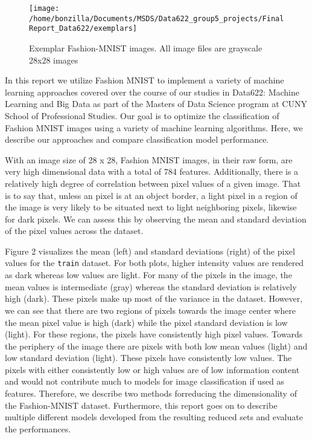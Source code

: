 \documentclass{article}
\begin{document}
\begin{figure}

{\centering \texttt{[image: /home/bonzilla/Documents/MSDS/Data622\_group5\_projects/FinalReport\_Data622/exemplars]} 

}

\caption{Exemplar Fashion-MNIST images. All image files are grayscale 28x28 images}\label{fig:unnamed-chunk-1}
\end{figure}

In this report we utilize Fashion MNIST to implement a variety of
machine learning approaches covered over the course of our studies in
Data622: Machine Learning and Big Data as part of the Masters of Data
Science program at CUNY School of Professional Studies. Our goal is to
optimize the classification of Fashion MNIST images using a variety of
machine learning algorithms. Here, we describe our approaches and
compare classification model performance.

With an image size of 28 x 28, Fashion MNIST images, in their raw form,
are very high dimensional data with a total of 784 features.
Additionally, there is a relatively high degree of correlation between
pixel values of a given image. That is to say that, unless an pixel is
at an object border, a light pixel in a region of the image is very
likely to be situated next to light neighboring pixels, likewise for
dark pixels. We can assess this by observing the mean and standard
deviation of the pixel values across the dataset.

Figure 2 visualizes the mean (left) and standard deviations (right) of
the pixel values for the \texttt{train} dataset. For both plots, higher
intensity values are rendered as dark whereas low values are light. For
many of the pixels in the image, the mean values is intermediate (gray)
whereas the standard deviation is relatively high (dark). These pixels
make up most of the variance in the dataset. However, we can see that
there are two regions of pixels towards the image center where the mean
pixel value is high (dark) while the pixel standard deviation is low
(light). For these regions, the pixels have consistently high pixel
values. Towards the periphery of the image there are pixels with both
low mean values (light) and low standard deviation (light). These pixels
have consistently low values. The pixels with either consistently low or
high values are of low information content and would not contribute much
to models for image classification if used as features. Therefore, we
describe two methods forreducing the dimensionality of the Fashion-MNIST
dataset. Furthermore, this report goes on to describe multiple different
models developed from the resulting reduced sets and evaluate the
performances.
\end{document}
